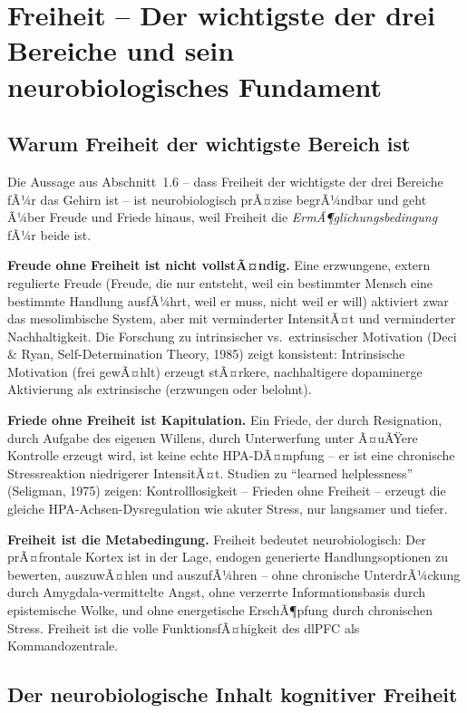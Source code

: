 ﻿\documentclass[12pt,a4paper]{report}
\theoremstyle{plain}
\theoremstyle{definition}
\theoremstyle{remark}
\begin{document}
	\section{Freiheit -- Der wichtigste der drei Bereiche und sein neurobiologisches Fundament}

	\subsection{Warum Freiheit der wichtigste Bereich ist}

	Die Aussage aus Abschnitt~1.6 -- dass Freiheit der wichtigste
	der drei Bereiche fÃ¼r das Gehirn ist -- ist neurobiologisch
	prÃ¤zise begrÃ¼ndbar und geht Ã¼ber Freude und Friede hinaus,
	weil Freiheit die \emph{ErmÃ¶glichungsbedingung} fÃ¼r beide ist.

	\textbf{Freude ohne Freiheit ist nicht vollstÃ¤ndig.}
	Eine erzwungene, extern regulierte Freude (Freude, die nur entsteht,
	weil ein bestimmter Mensch eine bestimmte Handlung ausfÃ¼hrt,
	weil er muss, nicht weil er will) aktiviert zwar das mesolimbische
	System, aber mit verminderter IntensitÃ¤t und verminderter Nachhaltigkeit.
	Die Forschung zu intrinsischer vs.\ extrinsischer Motivation
	(Deci \& Ryan, Self-Determination Theory, 1985) zeigt konsistent:
	Intrinsische Motivation (frei gewÃ¤hlt) erzeugt stÃ¤rkere, nachhaltigere
	dopaminerge Aktivierung als extrinsische (erzwungen oder belohnt).

	\textbf{Friede ohne Freiheit ist Kapitulation.}
	Ein Friede, der durch Resignation, durch Aufgabe des eigenen Willens,
	durch Unterwerfung unter Ã¤uÃŸere Kontrolle erzeugt wird,
	ist keine echte HPA-DÃ¤mpfung -- er ist eine chronische Stressreaktion
	niedrigerer IntensitÃ¤t. Studien zu ``learned helplessness''
	(Seligman, 1975) zeigen: Kontrolllosigkeit -- Frieden ohne Freiheit --
	erzeugt die gleiche HPA-Achsen-Dysregulation wie akuter Stress,
	nur langsamer und tiefer.

	\textbf{Freiheit ist die Metabedingung.}
	Freiheit bedeutet neurobiologisch: Der prÃ¤frontale Kortex
	ist in der Lage, endogen generierte Handlungsoptionen zu bewerten,
	auszuwÃ¤hlen und auszufÃ¼hren -- ohne chronische UnterdrÃ¼ckung durch
	Amygdala-vermittelte Angst, ohne verzerrte Informationsbasis
	durch epistemische Wolke, und ohne energetische ErschÃ¶pfung durch
	chronischen Stress. Freiheit ist die volle FunktionsfÃ¤higkeit
	des dlPFC als Kommandozentrale.

	\subsection{Der neurobiologische Inhalt kognitiver Freiheit}
\end{document}
